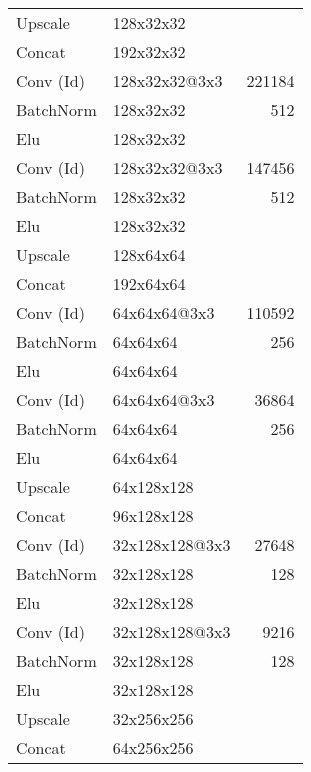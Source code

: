 \begin{table}[htp]
{\begin{tabular}{llr}
	Upscale              & 128x32x32       &                 \\ 
	Concat               & 192x32x32       &                 \\ 
	Conv (Id)            & 128x32x32@3x3   & 221184          \\ 
	BatchNorm            & 128x32x32       & 512             \\ 
	Elu                  & 128x32x32       &                 \\ 
	Conv (Id)            & 128x32x32@3x3   & 147456          \\ 
	BatchNorm            & 128x32x32       & 512             \\ 
	Elu                  & 128x32x32       &                 \\ 
	Upscale              & 128x64x64       &                 \\ 
	Concat               & 192x64x64       &                 \\ 
	Conv (Id)            & 64x64x64@3x3    & 110592          \\ 
	BatchNorm            & 64x64x64        & 256             \\ 
	Elu                  & 64x64x64        &                 \\ 
	Conv (Id)            & 64x64x64@3x3    & 36864           \\ 
	BatchNorm            & 64x64x64        & 256             \\ 
	Elu                  & 64x64x64        &                 \\ 
	Upscale              & 64x128x128      &                 \\ 
	Concat               & 96x128x128      &                 \\ 
	Conv (Id)            & 32x128x128@3x3  & 27648           \\ 
	BatchNorm            & 32x128x128      & 128             \\ 
	Elu                  & 32x128x128      &                 \\ 
	Conv (Id)            & 32x128x128@3x3  & 9216            \\ 
	BatchNorm            & 32x128x128      & 128             \\ 
	Elu                  & 32x128x128      &                 \\ 
	Upscale              & 32x256x256      &                 \\ 
	Concat               & 64x256x256      &                 \\ 

\end{tabular}}
\end{table}
